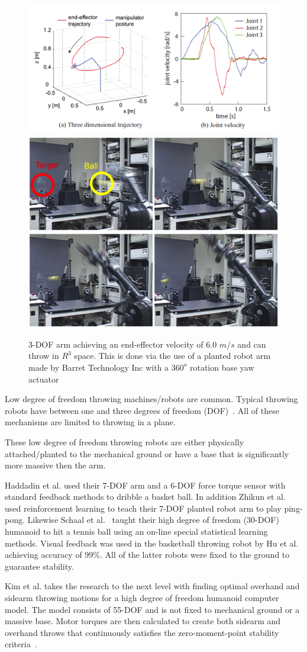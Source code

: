 \begin{figure}[thpb]
  \centering
\includegraphics[width=0.6\columnwidth]{./background/pix/senoo2.png}\includegraphics[width=0.4\columnwidth]{./background/pix/senoo1.png}
  \caption{3-DOF arm achieving an end-effector velocity of 6.0 $m/s$ and can throw in $R^3$ space.
This is done via the use of a planted robot arm made by Barret Technology Inc with a $360^o$ rotation base yaw actuator}
  \label{fig:senoo}
\end{figure}
 

Low degree of freedom throwing machines/robots are common.  
Typical throwing robots have between one and three degrees of freedom (DOF)~\cite{509405, Lynch97dynamicnonprehensile, 5152525, 509335, springerlink:10.1007/s10015-006-0401-0}.
All of these mechanisms are limited to throwing in a plane.   



These low degree of freedom throwing robots are either physically attached/planted to the mechanical ground or have a base that is significantly more massive then the arm.  

Haddadin et al.\cite{6094757} used their 7-DOF arm and a 6-DOF force torque sensor with standard feedback methods to dribble a basket ball.  
In addition Zhikun et al.~\cite{6094892} used reinforcement learning to teach their 7-DOF planted robot arm to play ping-pong.  
Likewise Schaal et al.~\cite{schaal01/BIRG} taught their high degree of freedom (30-DOF) humanoid to hit a tennis ball using an on-line special statistical learning methods.
Visual feedback was used in the basketball throwing robot by Hu et al.~\cite{5649335} achieving accuracy of 99\%.  
All of the latter robots were fixed to the ground to guarantee stability.

Kim et al. \cite{5686315,JooH2011438} takes the research to the next level with finding optimal overhand and sidearm throwing motions for a high degree of freedom humanoid computer model.  The model consists of 55-DOF and is not fixed to mechanical ground or a massive base.  Motor torques are then calculated to create both sidearm and overhand throws that continuously satisfies the zero-moment-point stability criteria~\cite{4309277}.  


